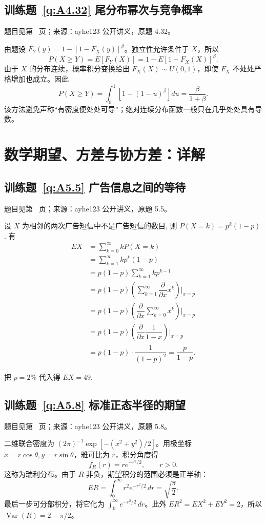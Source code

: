 \documentclass[UTF8,12pt,a4paper,fontset=fandol]{ctexbook}
\begin{document}
\subsection*{训练题~\ref{q:A4.32} 尾分布幂次与竞争概率}\label{a:A4.32}{\small 题目见第~\pageref{q:A4.32} 页；来源：ayhe123 公开讲义，原题 4.32。}
\begin{solve}由题设 $F_Y(y)=1-[1-F_X(y)]^\beta$。独立性允许条件于 $X$，所以\[P(X\ge Y)=E[F_Y(X)]=1-E[1-F_X(X)]^\beta.\]由于 $X$ 的分布连续，概率积分变换给出 $F_X(X)\sim U(0,1)$，即使 $F_X$ 不处处严格增加也成立。因此\[P(X\ge Y)=\int_0^1[1-(1-u)^\beta]du=\frac{\beta}{1+\beta}.\]该方法避免声称“有密度便处处可导”；绝对连续分布函数一般只在几乎处处具有导数。\end{solve}

\clearpage\section*{数学期望、方差与协方差：详解}

\subsection*{训练题~\ref{q:A5.5} 广告信息之间的等待}\label{a:A5.5}{\small 题目见第~\pageref{q:A5.5} 页；来源：ayhe123 公开讲义，原题 5.5。}
\begin{solve}
    设 $X$ 为相邻的两次广告短信中不是广告短信的数目, 则 $P(X=k)=p^k(1-p)$. 有
    \begin{align*}
        EX & =\sum\limits_{k=0}^\infty kP(X=k) \\
        & =\sum\limits_{k=1}^\infty kp^k(1-p) \\
        & =p(1-p)\sum\limits_{k=1}^\infty kp^{k-1} \\
        & =p(1-p)\left(\sum\limits_{k=1}^\infty\dfrac{\partial}{\partial x}x^k\right)\Bigg|_{x=p} \\
        & =p(1-p)\left(\dfrac{\partial}{\partial x}\sum\limits_{k=0}^\infty x^k\right)\Bigg|_{x=p} \\
        & =p(1-p)\left(\dfrac{\partial}{\partial x}\dfrac{1}{1-x}\right)\Bigg|_{x=p} \\
        & =p(1-p)\cdot\dfrac{1}{(1-p)^2}=\dfrac{p}{1-p}.
    \end{align*}

    把 $p=2\%$ 代入得 $EX=49$.
\end{solve}

\subsection*{训练题~\ref{q:A5.8} 标准正态半径的期望}\label{a:A5.8}{\small 题目见第~\pageref{q:A5.8} 页；来源：ayhe123 公开讲义，原题 5.8。}
\begin{solve}二维联合密度为 $(2\pi)^{-1}\exp[-(x^2+y^2)/2]$。用极坐标 $x=r\cos\theta,y=r\sin\theta$，雅可比为 $r$，积分角度得\[f_R(r)=r e^{-r^2/2},\qquad r>0.\]这称为瑞利分布。由于 $R$ 非负，期望积分的范围必须是正半轴：\[ER=\int_0^\infty r^2e^{-r^2/2}\,dr=\sqrt{\frac\pi2}.\]最后一步可分部积分，将它化为 $\int_0^\infty e^{-r^2/2}\,dr$。此外 $ER^2=EX^2+EY^2=2$，所以 $\operatorname{Var}(R)=2-\pi/2$。\end{solve}
\end{document}
